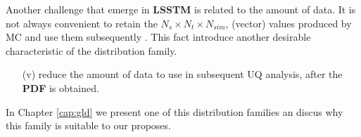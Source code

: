 Another challenge that emerge in \textbf{LSSTM} is related to the amount of data. It is not always convenient to retain the $N_{s}\times N_{t}\times N_{sim}$, (vector) values produced by MC and use them subsequently \cite{Cox2012}. This fact introduce another desirable characteristic of the distribution family.

\begin{itemize}
\item[(v)] reduce the amount of data to use in subsequent UQ analysis, after the \textbf{PDF} is obtained. 
\end{itemize}

In Chapter \ref{cap:gld} we present one of this distribution families an discus why this family is suitable to our proposes. 

